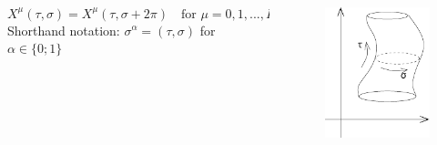 \documentclass[aspectratio=169]{beamer}
\begin{document}
\begin{frame}[t]
\begin{itemize}
\begin{columns}
\begin{column}{0.8\textwidth}
					\begin{equation*}
					X^\mu(\tau,\sigma) = X^\mu(\tau,\sigma+2\pi) \quad  \text{for $\mu$} = 0,1,...,D-1; \, \sigma \in \left[0;2\pi\right)
					\end{equation*}
					Shorthand notation: $\sigma^\alpha = (\tau,\sigma)$ for $\alpha \in \{0;1\}$\\
				\end{column}
				\begin{column}{0.2\textwidth}
					\begin{figure}
						\centering
						\includegraphics[width=\linewidth]{res/TongP21_graph}
					\end{figure}
					
				\end{column}
			\end{columns}
		\end{itemize}
	\end{frame}
	
\end{document}
